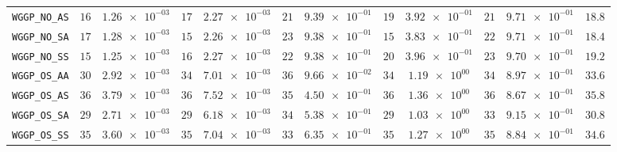 \begin{xltabular}{\textwidth}{l||cC|cC|cC|cC|cC||c}
	\texttt{WGGP\_NO\_AS} & $ 16$ & $ \num{1.26e-03}$ & $ 17$ & $ \num{2.27e-03}$ & $ 21$ & $ \num{9.39e-01}$ & $ 19$ & $ \num{3.92e-01}$ & $ 21$ & $ \num{9.71e-01}$ & $ 18.8$  \\
	\texttt{WGGP\_NO\_SA} & $ 17$ & $ \num{1.28e-03}$ & $ 15$ & $ \num{2.26e-03}$ & $ 23$ & $ \num{9.38e-01}$ & $ 15$ & $ \num{3.83e-01}$ & $ 22$ & $ \num{9.71e-01}$ & $ 18.4$  \\
	\texttt{WGGP\_NO\_SS} & $ 15$ & $ \num{1.25e-03}$ & $ 16$ & $ \num{2.27e-03}$ & $ 22$ & $ \num{9.38e-01}$ & $ 20$ & $ \num{3.96e-01}$ & $ 23$ & $ \num{9.70e-01}$ & $ 19.2$  \\
	\texttt{WGGP\_OS\_AA} & $ 30$ & $ \num{2.92e-03}$ & $ 34$ & $ \num{7.01e-03}$ & $ 36$ & $ \num{9.66e-02}$ & $ 34$ & $ \num{1.19e+00}$ & $ 34$ & $ \num{8.97e-01}$ & $ 33.6$  \\
	\texttt{WGGP\_OS\_AS} & $ 36$ & $ \num{3.79e-03}$ & $ 36$ & $ \num{7.52e-03}$ & $ 35$ & $ \num{4.50e-01}$ & $ 36$ & $ \num{1.36e+00}$ & $ 36$ & $ \num{8.67e-01}$ & $ 35.8$  \\
	\texttt{WGGP\_OS\_SA} & $ 29$ & $ \num{2.71e-03}$ & $ 29$ & $ \num{6.18e-03}$ & $ 34$ & $ \num{5.38e-01}$ & $ 29$ & $ \num{1.03e+00}$ & $ 33$ & $ \num{9.15e-01}$ & $ 30.8$  \\
	\texttt{WGGP\_OS\_SS} & $ 35$ & $ \num{3.60e-03}$ & $ 35$ & $ \num{7.04e-03}$ & $ 33$ & $ \num{6.35e-01}$ & $ 35$ & $ \num{1.27e+00}$ & $ 35$ & $ \num{8.84e-01}$ & $ 34.6$  \\

\end{xltabular}
